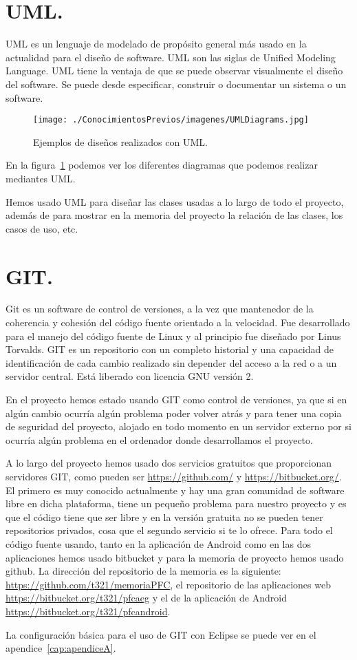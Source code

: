 \section{UML.}

UML es un lenguaje de modelado de propósito general más usado en la actualidad para el diseño de software. UML son las siglas de Unified Modeling Language. UML tiene la ventaja de que se puede observar visualmente el diseño del software. Se puede desde especificar, construir o documentar un sistema o un software.

\begin{figure}
  \centering
    \texttt{[image: ./ConocimientosPrevios/imagenes/UMLDiagrams.jpg]}
  \caption{Ejemplos de diseños realizados con UML.}
  \label{fig:UMLDiagrams}
\end{figure}

En la figura~\ref{fig:UMLDiagrams} podemos ver los diferentes diagramas que podemos realizar mediantes UML.

Hemos usado UML para diseñar las clases usadas a lo largo de todo el proyecto, además de para mostrar en la memoria del proyecto la relación de las clases, los casos de uso, etc.

\section{GIT.}

Git es un software de control de versiones, a la vez que mantenedor de la coherencia y cohesión del código fuente orientado a la velocidad. Fue desarrollado para el manejo del código fuente de Linux y al principio fue diseñado por Linus Torvalds. GIT es un repositorio con un completo historial y una capacidad de identificación de cada cambio realizado sin depender del acceso a la red o a un servidor central. Está liberado con licencia GNU versión 2.

En el proyecto hemos estado usando GIT como control de versiones, ya que si en algún cambio ocurría algún problema poder volver atrás y para tener una copia de seguridad del proyecto, alojado en todo momento en un servidor externo por si ocurría algún problema en el ordenador donde desarrollamos el proyecto.

A lo largo del proyecto hemos usado dos servicios gratuitos  que proporcionan servidores GIT, como pueden ser \url{https://github.com/} y \url{https://bitbucket.org/}. El primero es muy conocido actualmente y hay una gran comunidad de software libre en dicha plataforma, tiene un pequeño problema para nuestro proyecto y es que el código tiene que ser libre y en la versión gratuita no se pueden tener repositorios privados, cosa que el segundo servicio si te lo ofrece. Para todo el código fuente usando, tanto en la aplicación de Android como en las dos aplicaciones hemos usado bitbucket y para la memoria de proyecto hemos usado github. La dirección del repositorio de la memoria es la siguiente: \url{https://github.com/t321/memoriaPFC}, el repositorio de las aplicaciones web \url{https://bitbucket.org/t321/pfcaeg} y el de la aplicación de Android \url{https://bitbucket.org/t321/pfcandroid}.

La configuración básica para el uso de GIT con Eclipse se puede ver en el apendice~\ref{cap:apendiceA}.  














